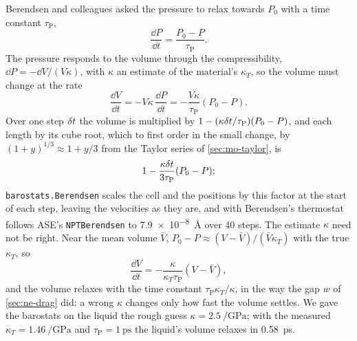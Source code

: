Berendsen and colleagues asked the pressure to relax towards $P_0$ with a
time constant $\tau_{\mathrm P}$\cite{Berendsen1984},
\begin{equation*}
   \frac{\dd P}{\dd t} = \frac{P_0 - P}{\tau_{\mathrm P}} .
\end{equation*}
The pressure responds to the volume through the compressibility, $\dd P
= -\dd V/(V\kappa)$, with $\kappa$ an estimate of the material's
$\kappa_T$, so the volume must change at the rate
\begin{equation*}
   \frac{\dd V}{\dd t} = -V\kappa\,\frac{\dd P}{\dd t}
   = -\frac{V\kappa}{\tau_{\mathrm P}}(P_0 - P) .
\end{equation*}
Over one step $\delta t$ the volume is multiplied by $1 -
(\kappa\delta t/\tau_{\mathrm P})(P_0 - P)$, and each length by its cube root,
which to first order in the small change, by $(1 + y)^{1/3} \approx 1 +
y/3$ from the Taylor series of \cref{sec:mo-taylor}, is
\begin{equation*}
   1 - \frac{\kappa\delta t}{3\tau_{\mathrm P}}(P_0 - P) ;
\end{equation*}
\texttt{barostats.Berendsen} scales the cell and the positions by this
factor at the start of each step, leaving the velocities as they are, and
with Berendsen's thermostat follows ASE's \texttt{NPTBerendsen} to
\SI{7.9e-8}{\angstrom} over 40 steps. The estimate $\kappa$ need not be
right. Near the mean volume $\bar V$, $P_0 - P \approx (V - \bar
V)/(\bar V\kappa_T)$ with the true $\kappa_T$, so
\begin{equation*}
   \frac{\dd V}{\dd t} = -\frac{\kappa}{\kappa_T\tau_{\mathrm P}}(V - \bar V) ,
\end{equation*}
and the volume relaxes with the time constant $\tau_{\mathrm P}\kappa_T/
\kappa$, in the way the gap $w$ of \cref{sec:ne-drag} did: a wrong
$\kappa$ changes only how fast the volume settles. We gave the
barostats on the liquid the rough guess $\kappa = \SI{2.5}{\per\giga
\pascal}$; with the measured $\kappa_T = \SI{1.46}{\per\giga\pascal}$ and
$\tau_{\mathrm P} = \SI{1}{\pico\second}$ the liquid's volume relaxes in
\SI{0.58}{\pico\second}.


